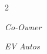 \documentclass[10pt, letterpaper]{article}
\newenvironment{twocolentry}[2][]{
    \onecolentry
    \def\secondColumn{#2}
    \setcolumnwidth{\fill, 4.5 cm}
    \begin{paracol}{2}
}{
    \switchcolumn \raggedleft \secondColumn
    \end{paracol}
    \endonecolentry
} %
\let\hrefWithoutArrow\href
\renewcommand{\href}[2]{\hrefWithoutArrow{#1}{\ifthenelse{\equal{#2}{}}{ }{#2 }\raisebox{.15ex}{\footnotesize \faExternalLink*}}}
\begin{document}
\begin{samepage}
\begin{twocolentry}{
\textit{Co-Owner}

\textit{EV Autos}
}
    
    
\end{twocolentry}





  


\end{samepage}
\end{document}
